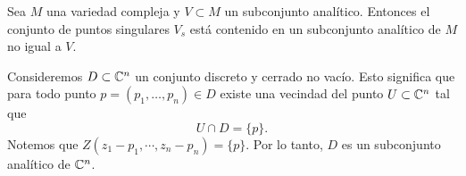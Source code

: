     \begin{propo}\parencite[Chap 0, Sec. 2.2]{griffiths}\label{puntossingulares}
    	Sea $M$ una variedad compleja y $V\subset M$ un subconjunto analítico. Entonces el conjunto de puntos singulares $V_s$ está contenido en un subconjunto analítico de $M$ no igual a $V$.
    \end{propo} 
    
   
    \begin{example}
    	Consideremos $D\subset \mathbb{C}^n$ un conjunto discreto y cerrado no vacío. Esto significa que para todo punto $p=(p_1,\dots,p_n)\in D$ existe una vecindad del punto $U\subset\mathbb{C}^n$ tal que
    	\begin{equation*}
    		U\cap D =\{p\}.
    	\end{equation*} 
    	Notemos que $Z(z_1-p_1,\cdots,z_n-p_n)=\{p\}$. Por lo tanto, $D$ es un subconjunto analítico de $\mathbb{C}^n$.
    \end{example}
    
